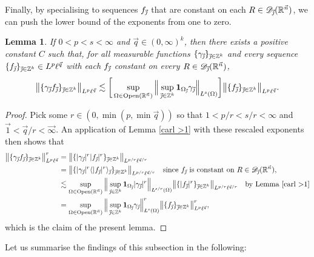 \documentclass[11pt, reqno]{amsart}
\newtheorem{lemma}[theorem]{Lemma}
\theoremstyle{definition}
\theoremstyle{remark}
\numberwithin{equation}{section}
\newcommand{\D}{\mathscr D}
\newcommand{\R}{\mathbb R}
\newcommand{\vone}{\vec 1}
\newcommand{\vinfty}{\vec{\infty}}
\newcommand{\vj}{\vec{\textit{\j}}}
\newcommand{\vn}{\vec n}
\newcommand{\vq}{\vec q}
\newcommand{\one}{\mathbf{1}}
\newcommand{\ave}[1]{\langle #1\rangle}
\newcommand{\aveL}{\textit{\L}}
\newcommand{\abs}[1]{|#1|}
\newcommand{\bNorm}[2]{\big\|#1\big\|_{#2}}
\newcommand{\BNorm}[2]{\Big\|#1\Big\|_{#2}}
\newcommand{\Open}{\mathrm{Open}}
\begin{document}
Finally, by specialising to sequences $f_{\vj}$ that are constant on each $R\in\D_{\vj}(\R^{\vn})$, we can push the lower bound of the exponents from one to zero.

\begin{lemma}\label{carl last}
If $0<p<s<\infty$ and $\vq\in(0,\infty)^k$,
then there exists a positive constant $C$ such that,
for all measurable functions $\{\gamma_{\vj}\}_{\vj\in\mathbb Z^k}$ and
every sequence $\{f_{\vj}\}_{\vj\in\mathbb Z^k}\in L^p\ell^{\vq}$
with each $f_{\vj}$ constant on every $R\in\D_{\vj}(\R^{\vn})$,
\begin{equation*}
\bNorm{\{\gamma_{\vj}f_{\vj}\}_{\vj\in\mathbb Z^k}}{L^p\ell^{\vq}}
\lesssim \bigg[\sup_{\Omega\in\Open(\R^{\vn})}\Big\|\sup_{\vj\in\mathbb Z^k}\one_{\Omega_{\vj}}\gamma_{\vj}\Big\|_{\aveL^s(\Omega)}\bigg]
\bNorm{\{ f_{\vj}\}_{\vj\in\mathbb Z^k}}{L^p\ell^{\vq}}.
\end{equation*}
\end{lemma}

\begin{proof}
Pick some $r\in(0,\min(p,\min\vq))$ so that $1<p/r<s/r<\infty$ and $\vone<\vq/r<\vinfty$. An application of Lemma \ref{carl >1} with these rescaled exponents then shows that
\begin{align*}
\bNorm{\{\gamma_{\vj}f_{\vj}\}_{\vj\in\mathbb Z^k}}{L^p\ell^{\vq}}^r
&=\bNorm{\{\abs{\gamma_{\vj}}^r\abs{f_{\vj}}^r\}_{\vj\in\mathbb Z^k}}{L^{p/r}\ell^{\vq/r}}  \\
&=\bNorm{\{\abs{\gamma_{\vj}}^r\ave{\abs{f_{\vj}}^r}_{\vj}\}_{\vj\in\mathbb Z^k}}{L^{p/r}\ell^{\vq/r}}
\quad\text{since $f_{\vj}$
is constant on $R\in\mathscr D_{\vj}(\R^{\vn})$}, \\
&\lesssim\sup_{\Omega\in\Open(\R^{\vn})}
\BNorm{\sup_{\vj\in\mathbb Z^k}\one_{\Omega_{\vj}}\abs{\gamma_{\vj}}^r}{\aveL^{s/r}(\Omega)}
\bNorm{\{\abs{f_{\vj}}^r\}_{\vj\in\mathbb Z^k}}{L^{p/r}\ell^{\vq/r}}
\quad\text{by Lemma \ref{carl >1}} \\
&=\sup_{\Omega\in\Open(\R^{\vn})}\BNorm{\sup_{\vj\in\mathbb Z^k}\one_{\Omega_{\vj}}\gamma_{\vj}}{\aveL^{s}(\Omega)}^r
\bNorm{\{ f_{\vj} \}_{\vj\in\mathbb Z^k}}{L^{p}\ell^{\vq}}^r,
\end{align*}
which is the claim of the present lemma.
\end{proof}

Let us summarise the findings of this subsection in the following:
\end{document}
